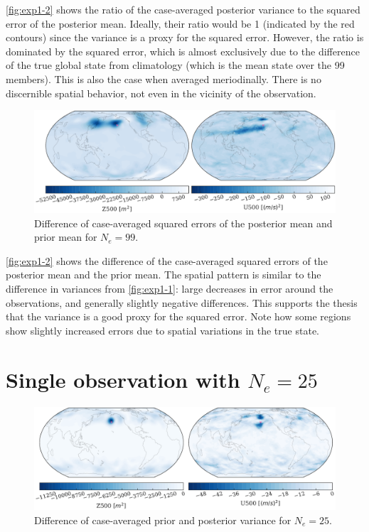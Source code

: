 \documentclass[parskip=half,DIV=16]{scrartcl}
\begin{document}
\cref{fig:exp1-2} shows the ratio of the case-averaged posterior variance to the squared error of the posterior mean. Ideally, their ratio would be 1 (indicated by the red contours) since the variance is a proxy for the squared error. However, the ratio is dominated by the squared error, which is almost exclusively due to the difference of the true global state from climatology (which is the mean state over the 99 members). This is also the case when averaged meriodinally. There is no discernible spatial behavior, not even in the vicinity of the observation.


\begin{figure}[H]
   \centering
   \includegraphics[width=\textwidth]{figures/exp1_prior_post_se.pdf}
   \caption{Difference of case-averaged squared errors of the posterior mean and prior mean for $N_e = 99$.}
   \label{fig:exp1-3}
\end{figure}

\cref{fig:exp1-2} shows the difference of the case-averaged squared errors of the posterior mean and the prior mean. The spatial pattern is similar to the difference in variances from \cref{fig:exp1-1}: large decreases in error around the observations, and generally slightly negative differences. This supports the thesis that the variance is a good proxy for the squared error. Note how some regions show slightly increased errors due to spatial variations in the true state.




\section{Single observation with $N_e = 25$}

\begin{figure}[H]
   \centering
   \includegraphics[width=\textwidth]{figures/exp2_prior_post_var.pdf}
   \caption{Difference of case-averaged prior and posterior variance for $N_e = 25$.}
   \label{fig:exp2-1}
\end{figure}
\end{document}

